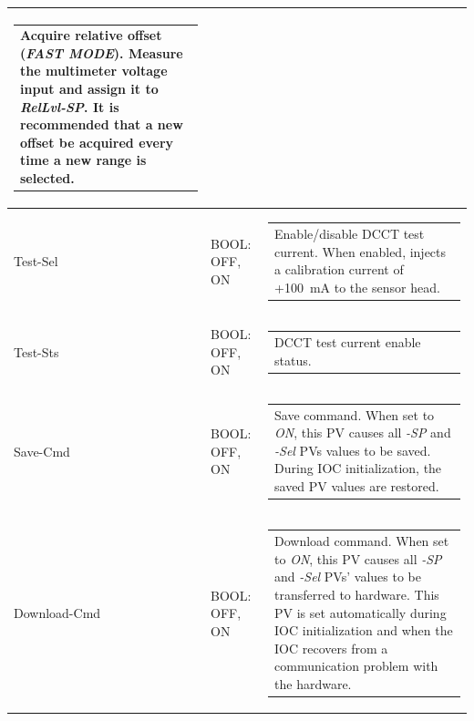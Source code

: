 \documentclass[openany]{article}
\begin{document}
\begin{longtable}{| m{3.0cm} m{4.5cm} m{7.0cm} |}
\begin{tabular}{@{}m{6cm}@{}}
						Acquire relative offset (\emph{FAST MODE}). Measure the multimeter voltage input and assign it to \emph{RelLvl-SP}. It is recommended that a new offset be acquired every time a new range is selected.
						\end{tabular} \\ \hline
		Test-Sel & BOOL: OFF, ON & \begin{tabular}{@{}m{6cm}@{}}
	    					Enable/disable DCCT test current. When enabled, injects a calibration current of +\SI{100}{\milli\ampere} to the sensor head.
						\end{tabular} \\ \hline
		Test-Sts & BOOL: OFF, ON & \begin{tabular}{@{}m{6cm}@{}}
 						DCCT test current enable status.
						\end{tabular} \\ \hline
		Save-Cmd & BOOL: OFF, ON & \begin{tabular}{@{}m{6cm}@{}}
 						Save command. When set to \emph{ON}, this PV causes all \emph{-SP} and \emph{-Sel} PVs values to be saved. During IOC initialization, the saved PV values are restored.
						\end{tabular} \\ \hline
		Download-Cmd & BOOL: OFF, ON & \begin{tabular}{@{}m{6cm}@{}}
 						Download command. When set to \emph{ON}, this PV causes all \emph{-SP} and \emph{-Sel} PVs' values to be transferred to hardware. This PV is set automatically during IOC initialization and when the IOC recovers from a communication problem with the hardware.
						\end{tabular} \\ \hline
	\end{longtable}
\end{document}
